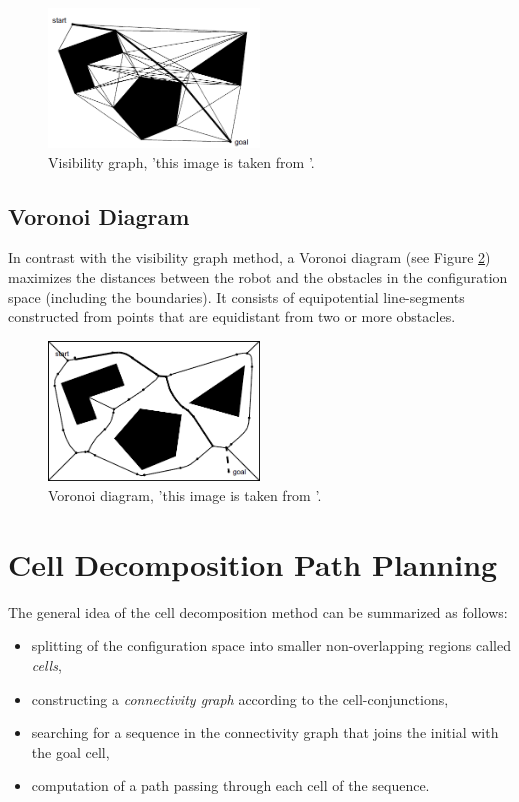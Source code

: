 \begin{figure} [h]
	\centering
	\includegraphics[width=0.5\textwidth]{images/visibility_graph.png}
	\caption{Visibility graph, 'this image is taken from \cite{Siegwart2004}'.}
	\label{pics:visibility_graph}
\end{figure}

\subsection{Voronoi Diagram}

In contrast with the visibility graph method, a Voronoi diagram (see Figure \ref{pics:voronoi_graph}) maximizes the distances between the robot and the obstacles in the configuration space (including the boundaries). It consists of equipotential line-segments constructed from points that are equidistant from two or more obstacles. 

\begin{figure} [h]
	\centering
	\includegraphics[width=0.5\textwidth]{images/voronoi_graph.png}
	\caption{Voronoi diagram, 'this image is taken from \cite{Siegwart2004}'.}
	\label{pics:voronoi_graph}
\end{figure}

\section{Cell Decomposition Path Planning}

The general idea of the cell decomposition method can be summarized as follows:

\begin{itemize}
	\item
	splitting of the configuration space into smaller non-overlapping regions called \textit{cells},
	\item
	constructing a \textit{connectivity graph} according to the cell-conjunctions,
	\item
	searching for a sequence in the connectivity graph that joins the initial with the goal cell,
	\item
	computation of a path passing through each cell of the sequence.
	
\end{itemize}

